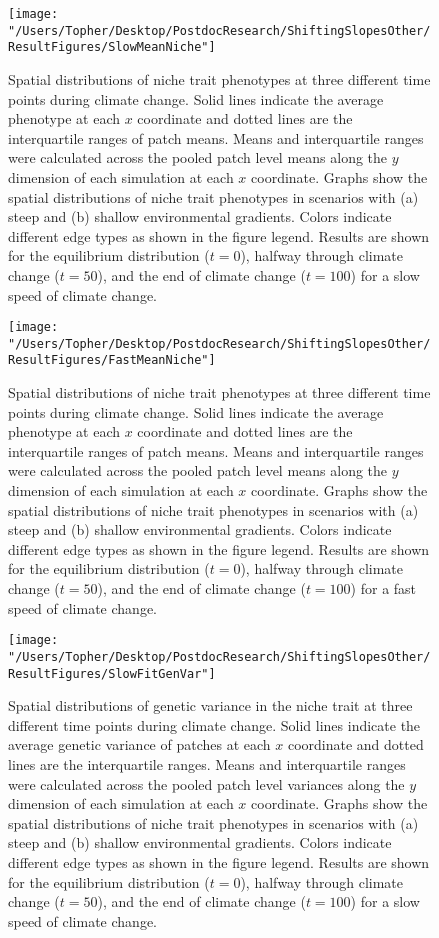 \documentclass[11pt]{article}
\begin{document}
\begin{figure}[h!]
\texttt{[image: "/Users/Topher/Desktop/PostdocResearch/ShiftingSlopesOther/ResultFigures/SlowMeanNiche"]}
\caption{Spatial distributions of niche trait phenotypes at three different time points during climate change. Solid lines indicate the average phenotype at each $x$ coordinate and dotted lines are the interquartile ranges of patch means. Means and interquartile ranges were calculated across the pooled patch level means along the $y$ dimension of each simulation at each $x$ coordinate. Graphs show the spatial distributions of niche trait phenotypes in scenarios with (a) steep and (b) shallow environmental gradients. Colors indicate different edge types as shown in the figure legend. Results are shown for the equilibrium distribution ($t = 0$), halfway through climate change ($t = 50$), and the end of climate change ($t = 100$) for a slow speed of climate change.}
\label{Fig:MeanNicheSlow}
\end{figure}

\clearpage

\begin{figure}[h!]
\texttt{[image: "/Users/Topher/Desktop/PostdocResearch/ShiftingSlopesOther/ResultFigures/FastMeanNiche"]}
\caption{Spatial distributions of niche trait phenotypes at three different time points during climate change. Solid lines indicate the average phenotype at each $x$ coordinate and dotted lines are the interquartile ranges of patch means. Means and interquartile ranges were calculated across the pooled patch level means along the $y$ dimension of each simulation at each $x$ coordinate. Graphs show the spatial distributions of niche trait phenotypes in scenarios with (a) steep and (b) shallow environmental gradients. Colors indicate different edge types as shown in the figure legend. Results are shown for the equilibrium distribution ($t = 0$), halfway through climate change ($t = 50$), and the end of climate change ($t = 100$) for a fast speed of climate change.}
\label{Fig:MeanNicheFast}
\end{figure}

\clearpage

\begin{figure}[h!]
\texttt{[image: "/Users/Topher/Desktop/PostdocResearch/ShiftingSlopesOther/ResultFigures/SlowFitGenVar"]}
\caption{Spatial distributions of genetic variance in the niche trait at three different time points during climate change. Solid lines indicate the average genetic variance of patches at each $x$ coordinate and dotted lines are the interquartile ranges. Means and interquartile ranges were calculated across the pooled patch level variances along the $y$ dimension of each simulation at each $x$ coordinate. Graphs show the spatial distributions of niche trait phenotypes in scenarios with (a) steep and (b) shallow environmental gradients. Colors indicate different edge types as shown in the figure legend. Results are shown for the equilibrium distribution ($t = 0$), halfway through climate change ($t = 50$), and the end of climate change ($t = 100$) for a slow speed of climate change.}
\label{Fig:FitGenVarSlow}
\end{figure}
\end{document}
